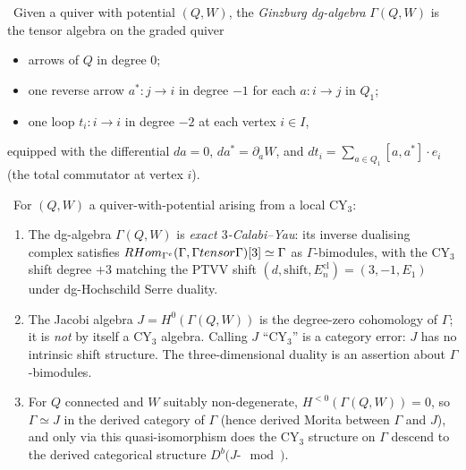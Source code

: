 \begin{definition}
\label{def:ginzburg-dg}
\ClaimStatusDefinition\ Given a quiver with potential $(Q, W)$, the
\emph{Ginzburg dg-algebra} $\Gamma(Q, W)$ is the tensor algebra on the graded
quiver
\begin{itemize}
\item arrows of $Q$ in degree $0$;
\item one reverse arrow $a^{*} \colon j \to i$ in degree $-1$ for each
$a \colon i \to j$ in $Q_1$;
\item one loop $t_i \colon i \to i$ in degree $-2$ at each vertex $i \in I$,
\end{itemize}
equipped with the differential
$d a = 0$, $d a^{*} = \partial_a W$, and $d t_i = \sum_{a \in Q_1}
[a, a^{*}] \cdot e_i$ (the total commutator at vertex $i$).
\end{definition}

\begin{proposition}
\label{prop:cy3-on-gamma-not-j}
\ClaimStatusProposition\ For $(Q, W)$ a quiver-with-potential arising from a
local CY$_3$:
\begin{enumerate}
\item[(a)] The dg-algebra $\Gamma(Q, W)$ is \emph{exact $3$-Calabi--Yau}: its
inverse dualising complex satisfies
$RHom_{\Gamma^e}(\Gamma, \Gamma tensor \Gamma)[3] \simeq \Gamma$ as
$\Gamma$-bimodules, with the CY$_3$ shift degree $+3$ matching the PTVV shift
$(d, \mathrm{shift}, E_n^{\mathrm{cl}}) = (3, -1, E_1)$ under dg-Hochschild
Serre duality.
\item[(b)] The Jacobi algebra $J = H^0(\Gamma(Q, W))$ is the degree-zero
cohomology of $\Gamma$; it is \emph{not} by itself a CY$_3$ algebra. Calling
$J$ ``CY$_3$'' is a category error: $J$ has no intrinsic shift structure. The
three-dimensional duality is an assertion about $\Gamma$-bimodules.
\item[(c)] For $Q$ connected and $W$ suitably non-degenerate,
$H^{<0}(\Gamma(Q, W)) = 0$, so $\Gamma \simeq J$ in the derived category of
$\Gamma$ (hence derived Morita between $\Gamma$ and $J$), and only via this
quasi-isomorphism does the CY$_3$ structure on $\Gamma$ descend to the
derived categorical structure $D^b(J\text{-}\mod)$.
\end{enumerate}
\end{proposition}


